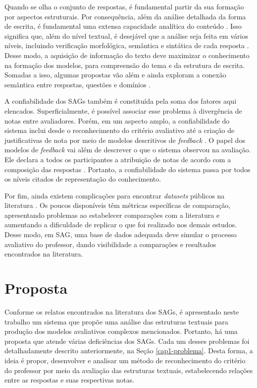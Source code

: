 Quando se olha o conjunto de respostas, é fundamental partir da sua formação por aspectos estruturais. Por consequência, além da análise detalhada da forma de escrita, é fundamental uma extensa capacidade analítica do conteúdo \cite{saha2018}. Isso significa que, além do nível textual, é desejável que a análise seja feita em vários níveis, incluindo verificação morfológica, semântica e sintática de cada resposta \cite{sakaguchi2015, riordan2019, sahu2020}. Desse modo, a aquisição de informação do texto deve maximizar o conhecimento na formação dos modelos, para compreensão do tema e da estrutura de escrita. Somadas a isso, algumas propostas vão além e ainda exploram a conexão semântica entre respostas, questões e domínios \cite{dzikovska2013, saha2019}.

A confiabilidade dos SAGs também é constituída pela soma dos fatores aqui elencados. Superficialmente, é possível associar esse problema à divergência de notas entre avaliadores. Porém, em um aspecto amplo, a confiabilidade do sistema inclui desde o reconhecimento do critério avaliativo até a criação de justificativas de nota por meio de modelos descritivos de \textit{feedback} \cite{kumar2019}. O papel dos modelos de \textit{feedback} vai além de descrever o que o sistema observou na avaliação. Ele declara a todos os participantes a atribuição de notas de acordo com a composição das respostas \cite{marvaniya2018, bernius2022}. Portanto, a confiabilidade do sistema passa por todos os níveis citados de representação do conhecimento.

Por fim, ainda existem complicações para encontrar \textit{datasets} públicos na literatura \cite{burrows2015}. Os poucos disponíveis têm métricas específicas de comparação, apresentando problemas ao estabelecer comparações com a literatura e aumentando a dificuldade de replicar o que foi realizado nos demais estudos. Desse modo, em SAG, uma base de dados adequada deve simular o processo avaliativo do professor, dando visibilidade a comparações e resultados encontrados na literatura.


\section{Proposta}
\label{cap1-proposta}

Conforme os relatos encontrados na literatura dos SAGs, é apresentado neste trabalho um sistema que propõe uma análise das estruturas textuais para produção dos modelos avaliativos complexos mencionados. Portanto, há uma proposta que atende várias deficiências dos SAGs. Cada um desses problemas foi detalhadamente descrito anteriormente, na Seção \ref{cap1-problema}. Desta forma, a ideia é propor, desenvolver e analisar um método de reconhecimento do critério do professor por meio da avaliação das estruturas textuais, estabelecendo relações entre as respostas e suas respectivas notas.

